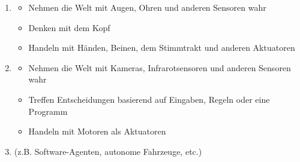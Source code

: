 \begin{enumerate}
    \item {}
    \begin{itemize}
        \item Nehmen die Welt mit Augen, Ohren und anderen Sensoren wahr
        \item Denken mit dem Kopf
        \item Handeln mit Händen, Beinen, dem Stimmtrakt und anderen Aktuatoren
    \end{itemize}
    \item {}
    \begin{itemize}
        \item Nehmen die Welt mit Kameras, Infrarotsensoren und anderen Sensoren wahr
        \item Treffen Entscheidungen basierend auf Eingaben, Regeln oder eine Programm
        \item Handeln mit Motoren als Aktuatoren
    \end{itemize}
    \item {} (z.B. Software-Agenten, autonome Fahrzeuge, etc.)
\end{enumerate}

